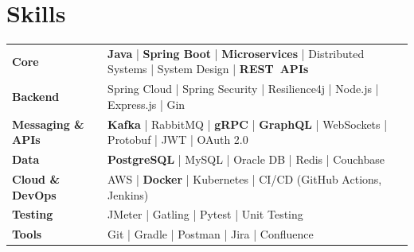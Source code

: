\section*{Skills}
\BigDivider
\vspace{-6pt}
\small

\noindent
\begingroup
\setlength{\tabcolsep}{4pt} %
\renewcommand{\arraystretch}{1.2}

\begin{tabular}{@{}p{3.4cm} p{15cm}}
\textbf{Core} & 
\textbf{Java} \;|\; 
\textbf{Spring Boot} \;|\; 
\textbf{Microservices} \;|\; 
Distributed Systems \;|\; 
System Design \;|\; 
\textbf{REST~APIs} \\

\textbf{Backend} & 
Spring Cloud \;|\; Spring Security \;|\; Resilience4j \;|\; Node.js \;|\; Express.js \;|\; Gin \\

\textbf{Messaging \& APIs} &  
\textbf{Kafka} \;|\; RabbitMQ \;|\; \textbf{gRPC} \;|\; \textbf{GraphQL} \;|\; WebSockets \;|\; Protobuf \;|\; JWT \;|\; OAuth 2.0 \\

\textbf{Data} & 
\textbf{PostgreSQL} \;|\; MySQL \;|\; Oracle DB \;|\; Redis \;|\; Couchbase \\

\textbf{Cloud \& DevOps} & 
AWS \;|\; \textbf{Docker} \;|\; Kubernetes \;|\; CI/CD (GitHub Actions, Jenkins) \\

\textbf{Testing} & 
JMeter \;|\; Gatling \;|\; Pytest \;|\; Unit Testing \\

\textbf{Tools} & 
Git \;|\; Gradle \;|\; Postman \;|\; Jira \;|\; Confluence \\

\end{tabular}
\endgroup

